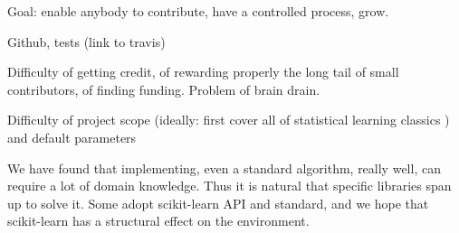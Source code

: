 \documentclass{article}
\begin{document}
Goal: enable anybody to contribute, have a controlled process, grow.

Github, tests (link to travis)

Difficulty of getting credit, of rewarding properly the long tail of small
contributors, of finding funding. Problem of brain drain.

Difficulty of project scope (ideally: first cover all of statistical
learning classics \cite{elemstatlearn}) and default parameters

We have found that implementing, even a standard algorithm, really well,
can require a lot of domain knowledge. Thus it is natural that specific
libraries span up to solve it. Some adopt scikit-learn API and standard,
and we hope that scikit-learn has a structural effect on the environment.

\small


\end{document}
